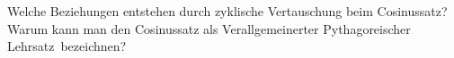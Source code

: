 \documentclass[%
11pt,%
twoside,%
titlepage,%
german,%
headsepline%
]{scrartcl}
\begin{document}
\begin{ueb}
Welche Beziehungen entstehen durch zyklische Vertauschung beim Cosinussatz? Warum kann man den Cosinussatz als \glqq Verallgemeinerter Pythagoreischer Lehrsatz\grqq\ bezeichnen?
\end{ueb}

\end{document}
